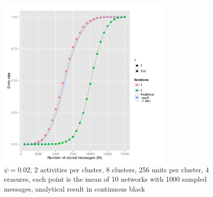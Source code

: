 \documentclass[english,10pt,twocolumn]{IEEEtran}
\theoremstyle{definition}
\begin{document}
%	
	\begin{figure}[!htb]
		\includegraphics[width=8.5cm]{Courbes/fig2psic8l256e4psi2percent}%
		\caption{$\psi = 0.02$, 2 activities per cluster, 8 clusters, 256 units per cluster, 4 erasures, each point is the mean of 10 networks with 1000 sampled messages, analytical result in continuous black}
		\label{psith}
	\end{figure}
	
\end{document}
